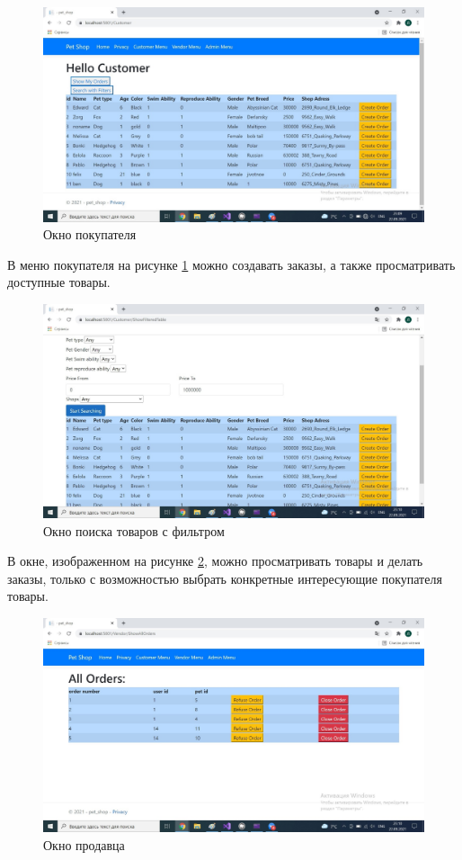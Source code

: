 \begin{figure}[ht!]
  \centering
  \includegraphics[scale=0.9]{img/interface3.png}
  \caption{Окно покупателя}
  \label{fig:interface3}
\end{figure}

В меню покупателя на рисунке \ref{fig:interface3} можно создавать заказы, а также просматривать доступные товары.

\begin{figure}[ht!]
  \centering
  \includegraphics[scale=0.9]{img/interface4.png}
  \caption{Окно поиска товаров с фильтром}
  \label{fig:interface4}
\end{figure}

В окне, изображенном на рисунке \ref{fig:interface4}, можно просматривать товары и делать заказы, только с возможностью выбрать конкретные интересующие покупателя товары.

\newpage

\begin{figure}[ht!]
  \centering
  \includegraphics[scale=0.9]{img/interface5.png}
  \caption{Окно продавца}
  \label{fig:interface5}
\end{figure}

